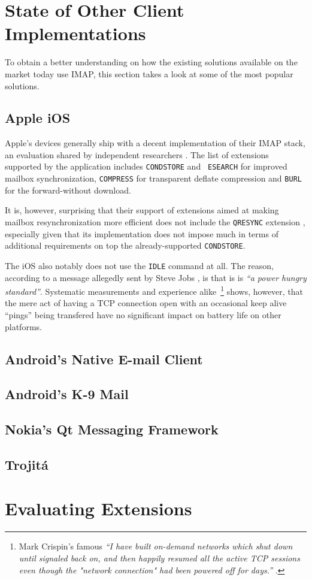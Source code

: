 \documentclass[trojita]{subfiles}
\begin{document}
\section{State of Other Client Implementations}

To obtain a better understanding on how the existing solutions available on the market today use IMAP, this section
takes a look at some of the most popular solutions.


\subsection{Apple iOS}

Apple's devices generally ship with a decent implementation of their IMAP stack, an evaluation shared by independent
researchers \cite{isode-iphone4}.  The list of extensions supported by the application includes {\tt CONDSTORE} and {\tt
ESEARCH} for improved mailbox synchronization, {\tt COMPRESS} for transparent deflate compression and {\tt BURL} for the
forward-without download.

It is, however, surprising that their support of extensions aimed at making mailbox resynchronization more efficient
does not include the {\tt QRESYNC} extension \cite{rfc5162}, especially given that its implementation does not impose
much in terms of additional requirements on top the already-supported {\tt CONDSTORE}.

The iOS also notably does not use the {\tt IDLE} command at all.  The reason, according to a message allegedly sent by
Steve Jobs \cite{jobs-ios-idle}, is that is is {\em ``a power hungry standard''}.  Systematic measurements
\cite{wcdma-energy} \cite{cirdland-fach-dch-measurements} and experience alike~\footnote{Mark Crispin's famous {\em ``I
have built on-demand networks which shut down until signaled back on, and then happily resumed all the active TCP
sessions even though the "network connection" had been powered off for days.''} \cite{crispin-no-ifup}.} shows, however,
that the mere act of having a TCP connection open with an occasional keep alive ``pings'' being transfered have no
significant impact on battery life on other platforms.

\subsection{Android's Native E-mail Client}

\subsection{Android's K-9 Mail}

\subsection{Nokia's Qt Messaging Framework}

\subsection{Trojitá}

\section{Evaluating Extensions}
\end{document}

